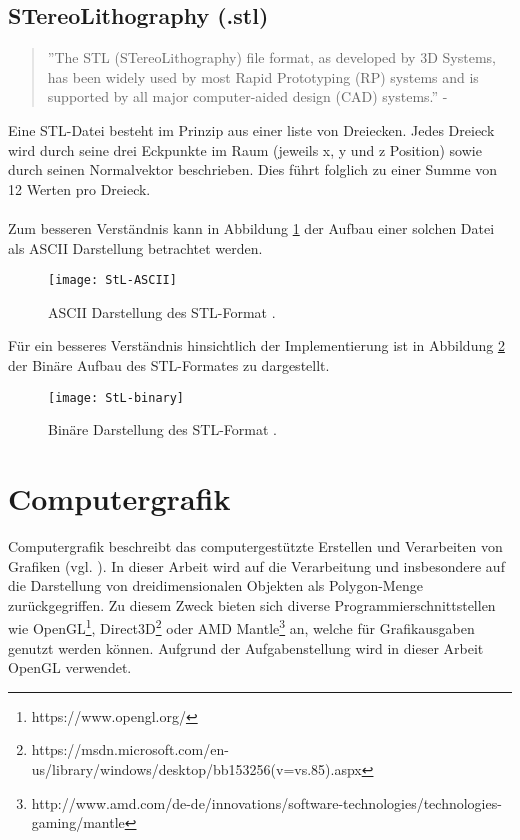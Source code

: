 \subsection{STereoLithography (.stl)}
\begin{quote}
	''The STL (STereoLithography) file format, as developed by 3D Systems, has been widely used by most Rapid Prototyping (RP) systems and is supported by all major computer-aided design (CAD) systems.'' - \citep{STereoLithography}
\end{quote}
Eine STL-Datei besteht im Prinzip aus einer liste von Dreiecken. Jedes Dreieck wird durch seine drei Eckpunkte im Raum (jeweils x, y und z Position) sowie durch seinen Normalvektor beschrieben. Dies führt folglich zu einer Summe von 12 Werten pro Dreieck.\\
\\
Zum besseren Verständnis kann in Abbildung \ref{fig:ASCIISTL} der Aufbau einer solchen Datei als ASCII Darstellung betrachtet werden. 

\begin{figure}[H]
	\centering
	\texttt{[image: StL-ASCII]}
	\caption{ASCII Darstellung des STL-Format \citep{STLFormat}.}
	\label{fig:ASCIISTL}
\end{figure}
\noindent Für ein besseres Verständnis hinsichtlich der Implementierung ist in Abbildung \ref{fig:BINARYSTL} der Binäre Aufbau des STL-Formates zu dargestellt. 
\begin{figure}[H]
	\centering
	\texttt{[image: StL-binary]}
	\caption{Binäre Darstellung des STL-Format \citep{STLFormat}.}
	\label{fig:BINARYSTL}
\end{figure}

\section{Computergrafik}
Computergrafik beschreibt das computergestützte Erstellen und Verarbeiten von Grafiken (vgl. \citep{ComputerGraphics}). In dieser Arbeit wird auf die Verarbeitung und insbesondere auf die Darstellung von dreidimensionalen Objekten als Polygon-Menge zurückgegriffen. Zu diesem Zweck bieten sich diverse Programmierschnittstellen wie OpenGL\footnote{https://www.opengl.org/}, Direct3D\footnote{https://msdn.microsoft.com/en-us/library/windows/desktop/bb153256(v=vs.85).aspx} oder AMD Mantle\footnote{http://www.amd.com/de-de/innovations/software-technologies/technologies-gaming/mantle} an, welche für Grafikausgaben genutzt werden können. Aufgrund der Aufgabenstellung wird in dieser Arbeit OpenGL verwendet.
